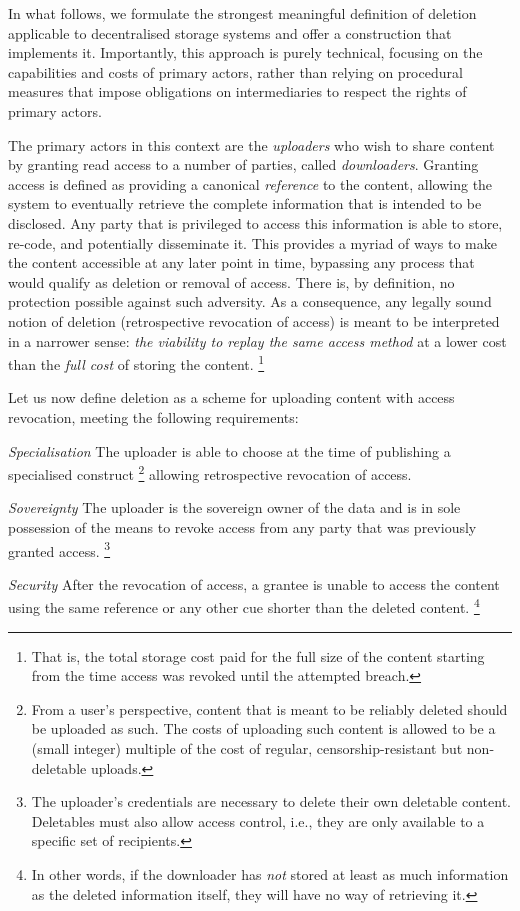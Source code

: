 In what follows, we formulate the strongest meaningful definition of deletion applicable to decentralised storage systems and offer a construction that implements it.
Importantly, this approach is purely technical, focusing on the capabilities and costs of primary actors, rather than relying on procedural measures that impose obligations on intermediaries to respect the rights of primary actors. 

The primary actors in this context are the \emph{uploaders} who wish to share content by granting read access to a number of parties, called \emph{downloaders}.  Granting access is defined as providing a canonical \emph{reference} to the content, allowing  the system to eventually retrieve the complete information that is intended to be disclosed. Any party that is privileged to access this information is able to store, re-code, and potentially disseminate it. This provides a myriad of ways to make the content accessible at any later point in time, bypassing any process that would qualify as deletion or removal of access. 
There is, by definition, no protection possible against such adversity. As a consequence, any legally sound notion of deletion (retrospective revocation of access) is meant to be interpreted in a narrower sense: \emph{the viability to replay the same access method}  at a lower cost than the \emph{full cost} of storing the content.%
%
\footnote{That is, the total storage cost paid for the full size of the content starting from the time access was revoked until the attempted breach.}

Let us now define deletion as a scheme for uploading content with access revocation, meeting the following requirements: 

\begin{labelledlist}
    \item[\emph{Specialisation}] The uploader is able to choose at the time of publishing a specialised construct%
%
\footnote{From a user's perspective, content that is meant to be reliably deleted should be uploaded as such. The costs of uploading such content is allowed to be a (small integer) multiple of the cost of regular, censorship-resistant but non-deletable uploads.}
%
    allowing retrospective revocation of access.
    \item[\emph{Sovereignty}] The uploader is the sovereign owner of the data and is in sole possession of the means to revoke access from any party that was previously granted access.%
%
\footnote{The uploader's credentials are necessary to delete their own deletable content. Deletables must also allow access control, i.e., they are only available to a specific set of recipients.}
%
    \item[\emph{Security}] After the revocation of access, a grantee is unable to access the content using the same reference or any other cue shorter than the deleted content.%
%
\footnote{In other words, if the downloader has \emph{not} stored at least as much information as the deleted information itself, they will have no way of retrieving it.}
%
\end{labelledlist}


